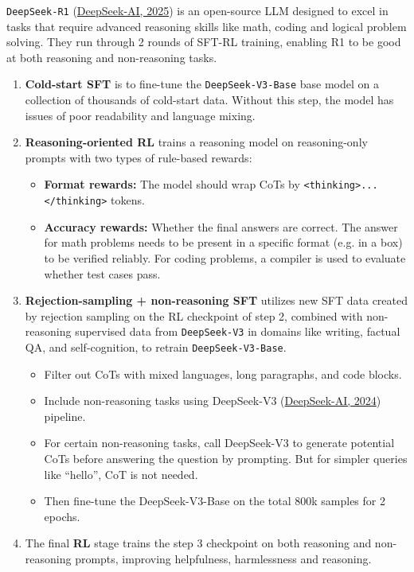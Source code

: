 \documentclass[12pt]{article}
\begin{document}
\texttt{DeepSeek-R1} (\href{https://arxiv.org/abs/2501.12948}{DeepSeek-AI, 2025}) is an open-source LLM designed to excel in tasks that require advanced reasoning skills like math, coding and logical problem solving. They run through 2 rounds of SFT-RL training, enabling R1 to be good at both reasoning and non-reasoning tasks.

\begin{enumerate}
    \item \textbf{Cold-start SFT} is to fine-tune the \texttt{DeepSeek-V3-Base} base model on a collection of thousands of cold-start data. Without this step, the model has issues of poor readability and language mixing.
    \item \textbf{Reasoning-oriented RL} trains a reasoning model on reasoning-only prompts with two types of rule-based rewards:
    \begin{itemize}
        \item \textbf{Format rewards:} The model should wrap CoTs by \texttt{<thinking>... </thinking>} tokens.
        \item \textbf{Accuracy rewards:} Whether the final answers are correct. The answer for math problems needs to be present in a specific format (e.g. in a box) to be verified reliably. For coding problems, a compiler is used to evaluate whether test cases pass.
    \end{itemize}
    \item \textbf{Rejection-sampling + non-reasoning SFT} utilizes new SFT data created by rejection sampling on the RL checkpoint of step 2, combined with non-reasoning supervised data from \texttt{DeepSeek-V3} in domains like writing, factual QA, and self-cognition, to retrain \texttt{DeepSeek-V3-Base}.
    \begin{itemize}
        \item Filter out CoTs with mixed languages, long paragraphs, and code blocks.
        \item Include non-reasoning tasks using DeepSeek-V3 (\href{https://arxiv.org/abs/2412.19437v1}{DeepSeek-AI, 2024}) pipeline.
        \item For certain non-reasoning tasks, call DeepSeek-V3 to generate potential CoTs before answering the question by prompting. But for simpler queries like ``hello'', CoT is not needed.
        \item Then fine-tune the DeepSeek-V3-Base on the total 800k samples for 2 epochs.
    \end{itemize}
    \item The final \textbf{RL} stage trains the step 3 checkpoint on both reasoning and non-reasoning prompts, improving helpfulness, harmlessness and reasoning.
\end{enumerate}
\end{document}
